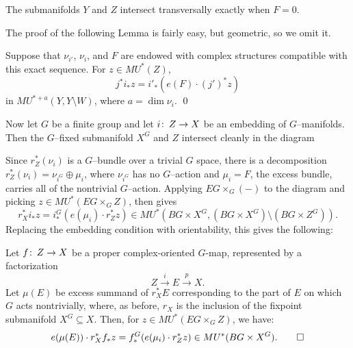 \begin{remark}
The submanifolds $Y$ and $Z$ intersect transversally exactly when $F = 0$.
\end{remark}

The proof of the following Lemma is fairly easy, but geometric, so we omit it.

\begin{lemma}\label{CleanIntersectionFormula}
Suppose that $\nu_{i'}$, $\nu_i$, and $F$ are endowed with complex structures compatible with this exact sequence. For $z \in MU^*(Z)$, \[j^* i_* z = i'_*(e(F) \cdot (j')^* z)\] in $MU^{*+a}(Y, Y \setminus W)$, where $a = \dim \nu_i$.  \qed
\end{lemma}

Now let $G$ be a finite group and let $i\colon\thinspace Z \to X$ be an embedding of $G$--manifolds. Then the $G$--fixed submanifold $X^G$ and $Z$ intersect cleanly in the diagram
\begin{center}
\end{center}
Since $r_Z^*(\nu_i)$ is a $G$--bundle over a trivial $G$ space, there is a decomposition $r_Z^*(\nu_i) = \nu_{i^G} \oplus \mu_i$, where $\nu_{i^G}$ has no $G$--action and $\mu_i = F$, the excess bundle, carries all of the nontrivial $G$--action.  Applying $EG \times_G (-)$ to the diagram and picking $z \in MU^*(EG \times_G Z)$,  then gives \[r_X^* i_* z = i^G_*(e(\mu_i) \cdot r_Z^* z) \in MU^*(BG \times X^G, (BG \times X^G) \setminus (BG \times Z^G)).\]  Replacing the embedding condition with orientability, this gives the following:

\begin{lemma}\label{ProperCOIntersectionFormula}
Let $f\colon\thinspace Z \to X$ be a proper complex-oriented $G$-map, represented by a factorization \[Z \xrightarrow i E \xrightarrow p X.\]  Let $\mu(E)$ be excess summand of $r_X^* E$ corresponding to the part of $E$ on which $G$ acts nontrivially, where, as before, $r_X$ is the inclusion of the fixpoint submanifold $X^G \subseteq X$.  Then, for $z \in MU^*(EG \times_G Z)$, we have: \[e(\mu(E)) \cdot r_X^* f_* z = f^G_*(e(\mu_i) \cdot r_Z^* z) \in MU^*(BG \times X^G). \qed\]
\end{lemma}

